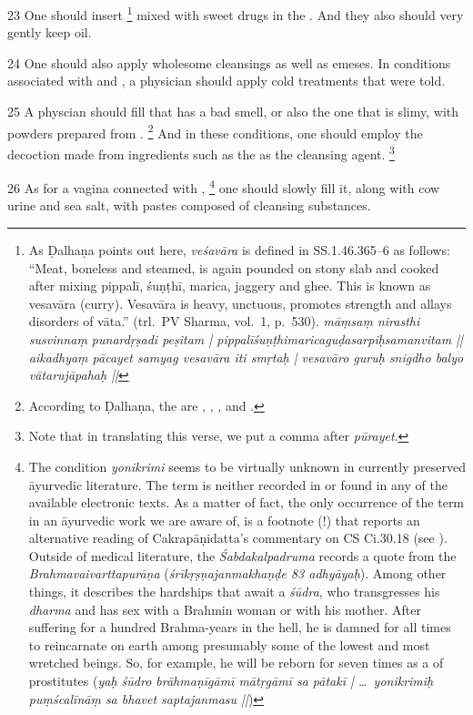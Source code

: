 \begin{translation}
\item [23]
One should insert %
\footnote{%
As Ḍalhaṇa points out here, \textit{veśavāra} is defined in SS.1.46.365--6 as 
follows: “Meat, boneless and steamed, is again pounded on stony slab and cooked 
after mixing pippalī, śuṇṭhī, marica, jaggery and ghee. This is known as vesavāra 
(curry). Vesavāra is heavy, unctuous, promotes strength and allays disorders of 
vāta.” (trl.\ PV Sharma, vol.\ 1, p.\ 530). 
\textit{māṃsaṃ nirasthi susvinnaṃ punardṛṣadi peṣitam | 
pippalīśuṇṭhimaricaguḍasarpiḥsamanvitam || aikadhyaṃ pācayet samyag 
vesavāra iti smṛtaḥ | vesavāro guruḥ snigdho balyo vātarujāpahaḥ ||}
} 
mixed with sweet drugs in the . And they also should very 
gently keep  oil.

\item [24]
One should also apply wholesome cleansings as well as emeses. 
In conditions associated with  and , 
a physician should apply cold treatments that were told.

\item [25]
A physcian should fill  that has a bad smell, or also the one that 
is slimy, with powders prepared from .%
\footnote{%
According to Ḍalhaṇa, the  are 
, , ,  and 
.
} 
And in these conditions, one should employ the decoction made from ingredients 
such as the  as the cleansing agent.%
\footnote{%
Note that in translating this verse, we put a comma after \textit{pūrayet}.%
}

\item [26]
As for a vagina connected with ,%
\footnote{%
The condition \textit{yonikrimi} seems to be virtually unknown in currently 
preserved  āyurvedic literature. The term is neither recorded in 
\textcite{josi-maha} or found in any of the available electronic texts. As a matter 
of fact, the only occurrence of the term in an āyurvedic work we are aware of, is a 
footnote (!) that reports an alternative reading of Cakrapāṇidatta's commentary 
on CS Ci.30.18 (see \textcite[635b]{cara-trikamji3}).
Outside of medical literature, the \textit{Śabdakalpadruma} records a quote from 
the \textit{Brahmavaivarttapurāṇa} (\textit{śrīkṛṣṇajanmakhaṇḍe 83 adhyāyaḥ}). 
Among other things, it describes the hardships that await a \textit{śūdra}, who 
transgresses his \textit{dharma} and has sex with a Brahmin woman or with his 
mother. After suffering for a hundred Brahma-years in the hell, he is damned for 
all times to reincarnate on earth among presumably some of the lowest and most 
wretched beings. So, for example, he will be reborn for seven times as a 
 of prostitutes (\textit{yaḥ śūdro brāhmaṇīgāmī 
mātṛgāmī sa pātakī | \ldots\ yonikrimiḥ puṃścalīnāṃ sa bhavet saptajanmasu 
||})     
} 
one should slowly fill it, along with cow urine and sea salt, with pastes composed 
of cleansing substances.


\end{translation}
